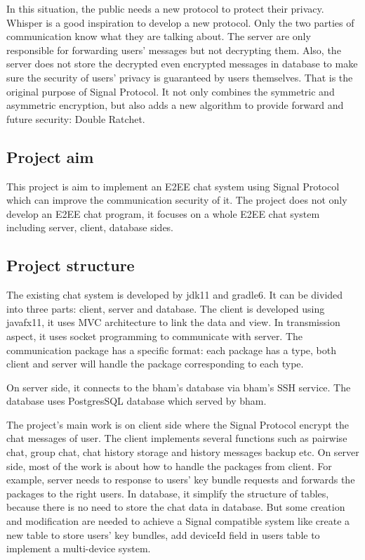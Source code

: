 In this situation, the public needs a new protocol to protect their privacy. Whisper is a good inspiration to develop a new protocol. Only the two parties of communication know what they are talking about. The server are only responsible for forwarding users' messages but not decrypting them. Also, the server does not store the decrypted even encrypted messages in database to make sure the security of users' privacy is guaranteed by users themselves. That is the original purpose of Signal Protocol. It not only combines the symmetric and asymmetric encryption, but also adds a new algorithm to provide forward and future security: Double Ratchet.

\subsection{Project aim}
This project is aim to implement an E2EE chat system using Signal Protocol which can improve the communication security of it. The project does not only develop an E2EE chat program, it focuses on a whole E2EE chat system including server, client, database sides. 

\subsection{Project structure}
The existing chat system is developed by jdk11 and gradle6. It can be divided into three parts: client, server and database. The client is developed using javafx11, it uses MVC architecture to link the data and view. In transmission aspect, it uses socket programming to communicate with server. The communication package has a specific format: each package has a type, both client and server will handle the package corresponding to each type.

On server side, it connects to the bham's database via bham's SSH service.
The database uses PostgresSQL database which served by bham.

The project's main work is on client side where the Signal Protocol encrypt the chat messages of user. The client implements several functions such as pairwise chat, group chat, chat history storage and history messages backup etc. On server side, most of the work is about how to handle the packages from client. For example, server needs to response to users' key bundle requests and forwards the packages to the right users. In database, it simplify the structure of tables, because there is no need to store the chat data in database. But some creation and modification are needed to achieve a Signal compatible system like create a new table to store users' key bundles, add deviceId field in users table to implement a multi-device system.

